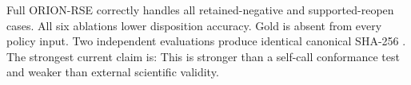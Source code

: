 {}Full ORION-RSE correctly handles all retained-negative and supported-reopen cases. All six ablations lower disposition accuracy. Gold is absent from every policy input. Two independent evaluations produce identical canonical SHA-256 .\markdownRendererInterblockSeparator
{}The strongest current claim is:  This is stronger than a self-call conformance test and weaker than external scientific validity.
\markdownRendererSectionEnd \markdownRendererDocumentEnd